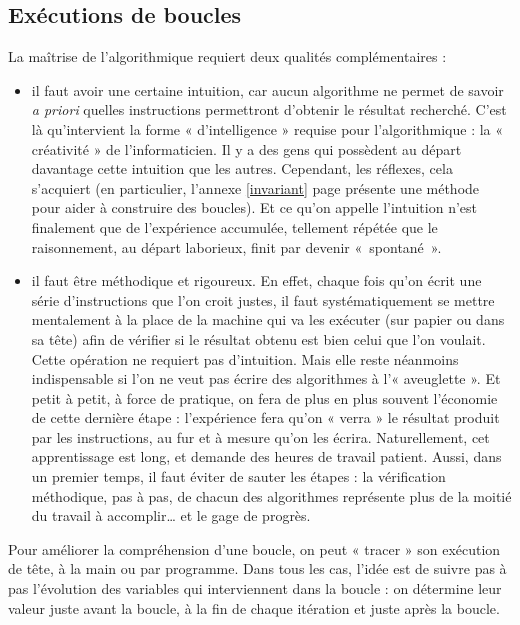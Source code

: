 \subsection{Exécutions de boucles}
La maîtrise de l'algorithmique requiert deux qualités complémentaires \cite{darmengeat} :
\begin{itemize}
\item il faut avoir une certaine intuition, car aucun algorithme ne permet de 
	savoir {\em a priori} quelles instructions permettront d'obtenir le résultat 
	recherché. C'est là qu'intervient la forme « d'intelligence » 
	requise pour l'algorithmique : la « créativité » de l'informaticien. 
	Il y a des gens qui possèdent au 
	départ davantage cette intuition que les autres.  
	Cependant, les réflexes, cela s'acquiert (en particulier, l'annexe \ref{invariant}
	page \pageref{invariant} présente une méthode pour aider à construire des boucles). 
	Et ce qu'on appelle l'intuition n'est finalement que de l'expérience accumulée,
	tellement répétée que le raisonnement, au départ laborieux, finit par 
	devenir «~spontané~».
\item il faut être méthodique et rigoureux. En effet, chaque fois qu'on écrit 
	une série d'instructions que l'on croit justes, il faut systématiquement 
	se mettre mentalement à la place de la machine qui va les exécuter
	(sur papier ou dans sa tête) afin de vérifier si le résultat obtenu 
	est bien celui que l'on voulait. 
	Cette opération ne requiert pas d'intuition. Mais elle reste néanmoins indispensable
	si l'on ne veut pas écrire des algorithmes à l'« aveuglette ».
	Et petit à petit, à force de pratique, on fera
	de plus en plus souvent l'économie de cette dernière étape : 
	l'expérience fera qu'on « verra » le résultat produit par les instructions, 
	au fur et à mesure qu'on les écrira. 
	Naturellement, cet apprentissage est long, et demande des heures de 
	travail patient. 
	Aussi, dans un premier temps, il faut éviter de sauter les étapes : la vérification méthodique, 
	pas à pas, de chacun des algorithmes représente plus de la moitié du travail à accomplir\ldots
	et le gage de progrès.
\end{itemize}

Pour améliorer la compréhension d'une boucle, on peut « tracer » son exécution de tête,
à la main ou par programme. Dans tous les cas, l'idée est de suivre pas à pas
l'évolution des variables qui interviennent dans la boucle : on détermine leur valeur 
juste avant la boucle, à la fin de chaque itération et juste après la boucle.

